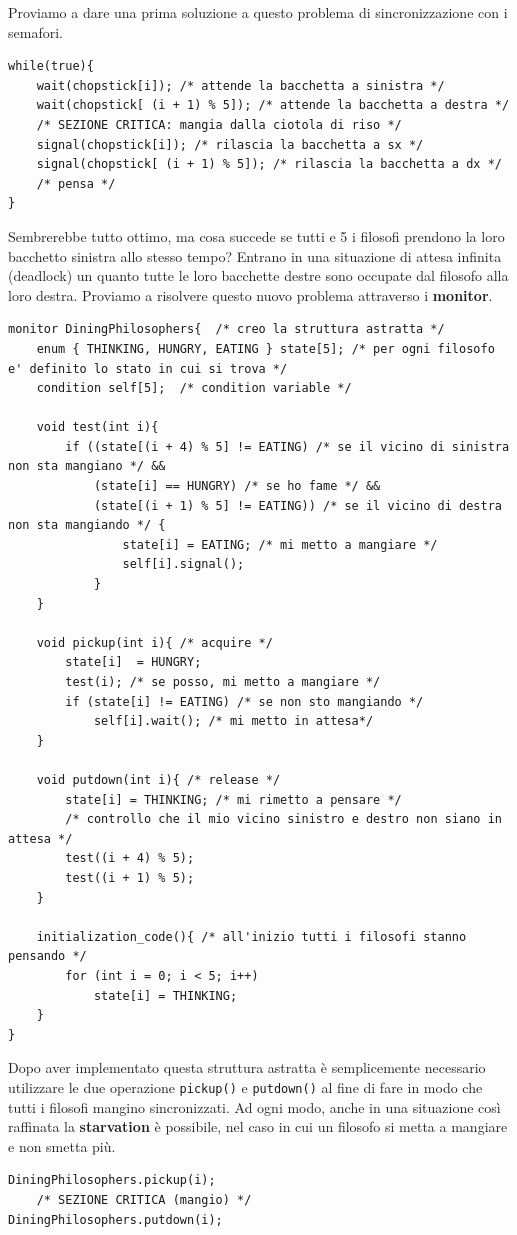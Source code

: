 Proviamo a dare una prima soluzione a questo problema di sincronizzazione con i semafori. 
\begin{lstlisting}[caption = {Risoluzione del problema dei  filosofi con i semafori}]
while(true){
    wait(chopstick[i]); /* attende la bacchetta a sinistra */
    wait(chopstick[ (i + 1) % 5]); /* attende la bacchetta a destra */
    /* SEZIONE CRITICA: mangia dalla ciotola di riso */
    signal(chopstick[i]); /* rilascia la bacchetta a sx */
    signal(chopstick[ (i + 1) % 5]); /* rilascia la bacchetta a dx */
    /* pensa */
}
\end{lstlisting}
Sembrerebbe tutto ottimo, ma cosa succede se tutti e 5 i filosofi prendono la loro bacchetto sinistra allo stesso tempo? Entrano in una situazione di attesa infinita (deadlock) un quanto tutte le loro bacchette destre sono occupate dal filosofo alla loro destra. Proviamo a risolvere questo nuovo problema attraverso i \textbf{monitor}.\label{utilizzo monitor}
\begin{lstlisting}[caption = {Risoluzione del problema dei  filosofi con i monitor}]
monitor DiningPhilosophers{  /* creo la struttura astratta */
    enum { THINKING, HUNGRY, EATING } state[5]; /* per ogni filosofo e' definito lo stato in cui si trova */
    condition self[5];  /* condition variable */

    void test(int i){
        if ((state[(i + 4) % 5] != EATING) /* se il vicino di sinistra non sta mangiano */ &&
            (state[i] == HUNGRY) /* se ho fame */ &&
            (state[(i + 1) % 5] != EATING)) /* se il vicino di destra non sta mangiando */ {
                state[i] = EATING; /* mi metto a mangiare */
                self[i].signal();
            }
    }

    void pickup(int i){ /* acquire */
        state[i]  = HUNGRY;
        test(i); /* se posso, mi metto a mangiare */
        if (state[i] != EATING) /* se non sto mangiando */
            self[i].wait(); /* mi metto in attesa*/
    }

    void putdown(int i){ /* release */
        state[i] = THINKING; /* mi rimetto a pensare */
        /* controllo che il mio vicino sinistro e destro non siano in attesa */
        test((i + 4) % 5);
        test((i + 1) % 5);
    }

    initialization_code(){ /* all'inizio tutti i filosofi stanno pensando */
        for (int i = 0; i < 5; i++)
            state[i] = THINKING; 
    }
}

\end{lstlisting}
Dopo aver implementato questa struttura astratta è semplicemente necessario utilizzare le due operazione \texttt{pickup()} e \texttt{putdown()} al fine di fare in modo che tutti i filosofi mangino sincronizzati. Ad ogni modo, anche in una situazione così raffinata la \textbf{starvation} è possibile, nel caso in cui un filosofo si metta a mangiare e non smetta più.
\begin{lstlisting}
DiningPhilosophers.pickup(i);
    /* SEZIONE CRITICA (mangio) */
DiningPhilosophers.putdown(i);
\end{lstlisting}
